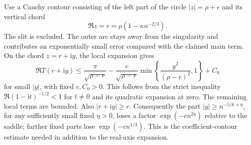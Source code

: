 \documentclass[11pt]{article}
\theoremstyle{remark}\newtheorem{remark}[theorem]{Remark}
\newcommand{\ii}{\mathrm i}
\begin{document}
Use a Cauchy contour consisting of the left part of the circle
$|z|=\rho+\epsilon$ and its vertical chord
\[
 \Re z=r=\rho(1-\kappa n^{-2/3}).
\]
The slit is excluded. The outer arc stays away from the singularity and
contributes an exponentially small error compared with the claimed main
term. On the chord $z=r+\ii y$, the local expansion gives
\begin{equation}\label{vav:dg:eq:decay}
 \Re T(r+\ii y)
 \le\frac{\pi}{\sqrt{\rho-r}}
 -\frac{c}{\sqrt{\rho-r}}
       \min\left\{\frac{y^2}{(\rho-r)^2},1\right\}+C_0
\end{equation}
for small $|y|$, with fixed $c,C_0>0$.
This follows from the strict inequality
$\Re(1-\ii t)^{-1/2}<1$ for $t\ne0$ and its quadratic expansion at zero.
The remaining local terms are bounded. Also $|r+\ii y|\ge r$.
Consequently the part $|y|\ge n^{-5/6+\eta}$, for any sufficiently small
fixed $\eta>0$, loses a factor $\exp(-c n^{2\eta})$ relative to the saddle;
farther fixed parts lose $\exp(-c n^{1/3})$.
This is the coefficient-contour estimate needed in addition to the
real-axis expansion.
\end{document}
